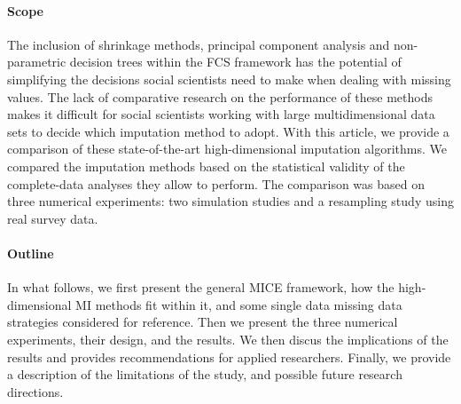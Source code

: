 \paragraph{Scope}
The inclusion of shrinkage methods, principal component analysis and non-parametric decision trees within the FCS framework 
has the potential of simplifying the decisions social scientists need to make when dealing with missing values.
The lack of comparative research on the performance of these methods makes it difficult for social scientists working with 
large multidimensional data sets to decide which imputation method to adopt.
With this article, we provide a comparison of these state-of-the-art high-dimensional imputation algorithms.
We compared the imputation methods based on the statistical validity of the complete-data analyses they allow to perform.
The comparison was based on three numerical experiments: two simulation studies and a resampling study using real survey 
data.
%
\paragraph{Outline}
In what follows, we first present the general MICE framework, how the high-dimensional MI methods fit within it, and some
single data missing data strategies considered for reference.
Then we present the three numerical experiments, their design, and the results.
We then discus the implications of the results and provides recommendations for applied researchers.
Finally, we provide a description of the limitations of the study, and possible future research directions.
